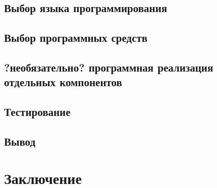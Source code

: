 \documentclass[a4paper,12pt]{report}
\numberwithin{equation}{section}
\begin{document}
\subsection{Выбор языка программирования}

\subsection{Выбор программных средств}

\subsection{?необязательно? программная реализация отдельных компонентов}

\subsection{Тестирование}

\subsection{Вывод}

\clearpage
\section{Заключение}
\end{document}
